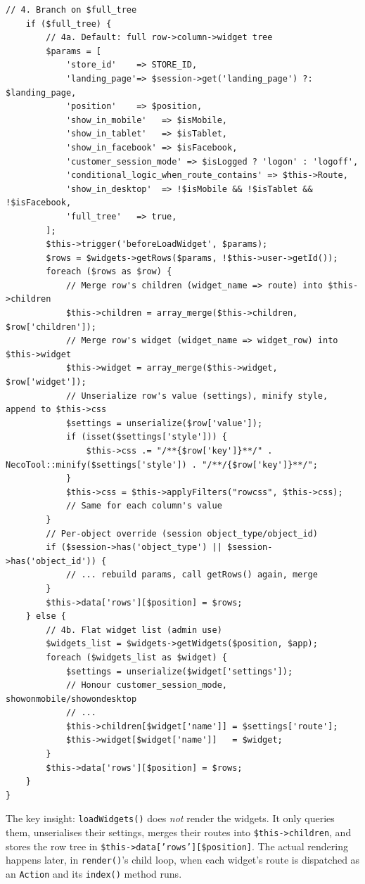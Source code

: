 \documentclass[11pt,a4paper]{article}
\begin{document}
\begin{lstlisting}[caption={\texttt{Controller::loadWidgets()} --- the widget-loading seam (abridged).},label={lst:loadwidgets}]
    // 4. Branch on $full_tree
    if ($full_tree) {
        // 4a. Default: full row->column->widget tree
        $params = [
            'store_id'    => STORE_ID,
            'landing_page'=> $session->get('landing_page') ?: $landing_page,
            'position'    => $position,
            'show_in_mobile'   => $isMobile,
            'show_in_tablet'   => $isTablet,
            'show_in_facebook' => $isFacebook,
            'customer_session_mode' => $isLogged ? 'logon' : 'logoff',
            'conditional_logic_when_route_contains' => $this->Route,
            'show_in_desktop'  => !$isMobile && !$isTablet && !$isFacebook,
            'full_tree'   => true,
        ];
        $this->trigger('beforeLoadWidget', $params);
        $rows = $widgets->getRows($params, !$this->user->getId());
        foreach ($rows as $row) {
            // Merge row's children (widget_name => route) into $this->children
            $this->children = array_merge($this->children, $row['children']);
            // Merge row's widget (widget_name => widget_row) into $this->widget
            $this->widget = array_merge($this->widget, $row['widget']);
            // Unserialize row's value (settings), minify style, append to $this->css
            $settings = unserialize($row['value']);
            if (isset($settings['style'])) {
                $this->css .= "/**{$row['key']}**/" . NecoTool::minify($settings['style']) . "/**/{$row['key']}**/";
            }
            $this->css = $this->applyFilters("rowcss", $this->css);
            // Same for each column's value
        }
        // Per-object override (session object_type/object_id)
        if ($session->has('object_type') || $session->has('object_id')) {
            // ... rebuild params, call getRows() again, merge
        }
        $this->data['rows'][$position] = $rows;
    } else {
        // 4b. Flat widget list (admin use)
        $widgets_list = $widgets->getWidgets($position, $app);
        foreach ($widgets_list as $widget) {
            $settings = unserialize($widget['settings']);
            // Honour customer_session_mode, showonmobile/showondesktop
            // ...
            $this->children[$widget['name']] = $settings['route'];
            $this->widget[$widget['name']]   = $widget;
        }
        $this->data['rows'][$position] = $rows;
    }
}
\end{lstlisting}

The key insight: \texttt{loadWidgets()} does \emph{not} render the
widgets. It only queries them, unserialises their settings, merges
their routes into \texttt{\$this->children}, and stores the row
tree in \texttt{\$this->data['rows'][\$position]}. The actual
rendering happens later, in \texttt{render()}'s child loop, when
each widget's route is dispatched as an \texttt{Action} and its
\texttt{index()} method runs.
\end{document}
